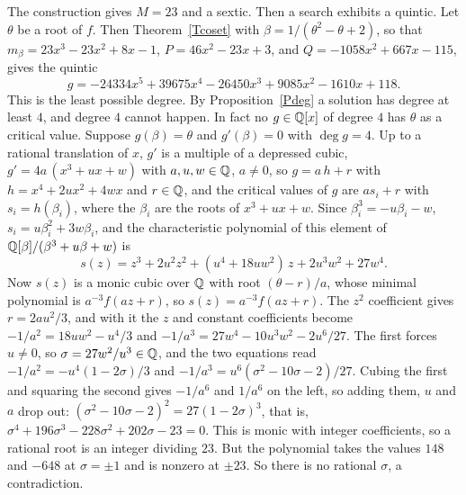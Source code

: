 \begin{example}[$f = x^{3}-x-1$]
  The construction gives $M = 23$ and a sextic. Then a search exhibits a
  quintic. Let $\theta$ be a root of $f$. Then Theorem~\ref{Tcoset}
  with $\beta = 1/(\theta^{2} - \theta + 2)$, so that
  $m_{\beta} = 23x^{3} - 23x^{2} + 8x - 1$, $P = 46x^{2} - 23x + 3$, and
  $Q = -1058x^{2} + 667x - 115$, gives the quintic
  \[
    g = -24334x^{5} + 39675x^{4} - 26450x^{3} + 9085x^{2} - 1610x + 118 .
  \]
  This is the least possible degree. By Proposition~\ref{Pdeg} a solution
  has degree at least $4$, and degree $4$ cannot happen. In fact no
  $g \in \mathbb{Q}[x]$ of degree $4$ has $\theta$ as a critical value. Suppose
  $g(\beta) = \theta$ and $g'(\beta) = 0$ with $\deg g = 4$. Up to a rational
  translation of $x$, $g'$ is a multiple of a depressed cubic,
  $g' = 4a\,(x^{3} + ux + w)$ with $a, u, w \in \mathbb{Q}$, $a \neq 0$, so
  $g = a\,h + r$ with $h = x^{4} + 2ux^{2} + 4wx$ and $r \in \mathbb{Q}$, and the
  critical values of $g$ are $a s_{i} + r$ with $s_{i} = h(\beta_{i})$, where
  the $\beta_{i}$ are the roots of $x^{3} + ux + w$. Since
  $\beta_{i}^{3} = -u\beta_{i} - w$, $s_{i} = u\beta_{i}^{2} + 3w\beta_{i}$,
  and the characteristic polynomial of this element of
  $\mathbb{Q}[\beta]/(\beta^{3} + u\beta + w)$ is
  \[
    s(z) = z^{3} + 2u^{2}z^{2} + (u^{4} + 18uw^{2})\,z + 2u^{3}w^{2} + 27w^{4} .
  \]
  Now $s(z)$ is a monic cubic over $\mathbb{Q}$ with root $(\theta - r)/a$, whose
  minimal polynomial is $a^{-3}f(az + r)$, so $s(z) = a^{-3}f(az + r)$. The
  $z^{2}$ coefficient gives $r = 2au^{2}/3$, and with it the $z$ and constant
  coefficients become $-1/a^{2} = 18uw^{2} - u^{4}/3$ and
  $-1/a^{3} = 27w^{4} - 10u^{3}w^{2} - 2u^{6}/27$. The first forces
  $u \neq 0$, so $\sigma = 27w^{2}/u^{3} \in \mathbb{Q}$, and the two equations read
  $-1/a^{2} = -u^{4}(1 - 2\sigma)/3$ and
  $-1/a^{3} = u^{6}(\sigma^{2} - 10\sigma - 2)/27$. Cubing the first and
  squaring the second gives $-1/a^{6}$ and $1/a^{6}$ on the left, so adding
  them, $u$ and $a$ drop out:
  $(\sigma^{2} - 10\sigma - 2)^{2} = 27(1 - 2\sigma)^{3}$, that is,
  $\sigma^{4} + 196\sigma^{3} - 228\sigma^{2} + 202\sigma - 23 = 0$. This is
  monic with integer coefficients, so a rational root is an integer dividing
  $23$. But the polynomial takes the values $148$ and $-648$ at
  $\sigma = \pm 1$ and is nonzero at $\pm 23$. So there is no rational
  $\sigma$, a contradiction.
\end{example}

